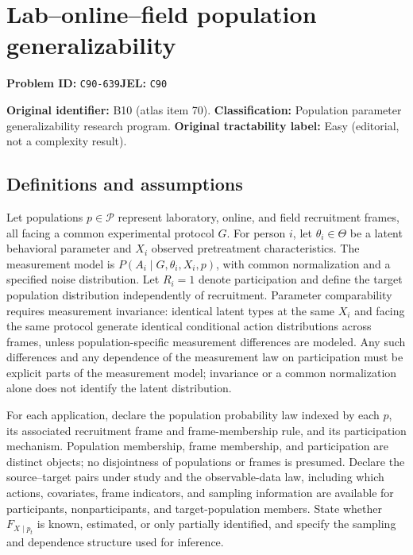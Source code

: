 \documentclass[11pt,a4paper]{article}
\begin{document}
\section*{Lab–online–field population generalizability}
\textbf{Problem ID:} \texttt{C90-639}\quad \textbf{JEL:} \texttt{C90}\par
\label{problem:OP-0070}
\label{atlas:prob:B10}

\noindent\textbf{Original identifier:} B10 (atlas item 70). \textbf{Classification:} Population parameter generalizability research program. \textbf{Original tractability label:} Easy (editorial, not a complexity result).

\subsection*{Definitions and assumptions}

Let populations $p\in\mathcal P$ represent laboratory, online, and field recruitment frames, all facing a common experimental protocol $G$. For person $i$, let $\theta_i\in\Theta$ be a latent behavioral parameter and $X_i$ observed pretreatment characteristics. The measurement model is $P(A_i\mid G,\theta_i,X_i,p)$, with common normalization and a specified noise distribution. Let $R_i=1$ denote participation and define the target population distribution independently of recruitment. Parameter comparability requires measurement invariance: identical latent types at the same $X_i$ and facing the same protocol generate identical conditional action distributions across frames, unless population-specific measurement differences are modeled. Any such differences and any dependence of the measurement law on participation must be explicit parts of the measurement model; invariance or a common normalization alone does not identify the latent distribution.

For each application, declare the population probability law indexed by each $p$, its associated recruitment frame and frame-membership rule, and its participation mechanism. Population membership, frame membership, and participation are distinct objects; no disjointness of populations or frames is presumed. Declare the source--target pairs under study and the observable-data law, including which actions, covariates, frame indicators, and sampling information are available for participants, nonparticipants, and target-population members. State whether $F_{X\mid p_t}$ is known, estimated, or only partially identified, and specify the sampling and dependence structure used for inference.
\end{document}
